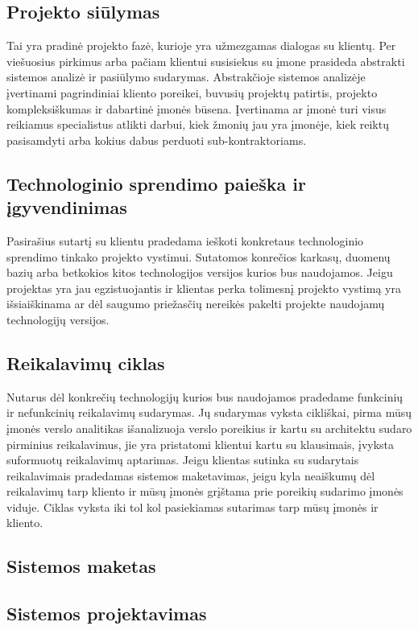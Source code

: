 \documentclass{VUMIFPSkursinis}
\begin{document}
	\subsection{Projekto siūlymas}
		Tai yra pradinė projekto fazė, kurioje yra užmezgamas dialogas su klientų. Per viešuosius pirkimus arba pačiam klientui susisiekus su įmone prasideda abstrakti sistemos analizė ir pasiūlymo sudarymas. Abstrakčioje sistemos analizėje įvertinami pagrindiniai kliento poreikei, buvusių projektų patirtis, projekto kompleksiškumas ir dabartinė įmonės būsena. Įvertinama ar įmonė turi visus reikiamus specialistus atlikti darbui, kiek žmonių jau yra įmonėje, kiek reiktų pasisamdyti arba kokius dabus perduoti sub-kontraktoriams.

	\subsection{Technologinio sprendimo paieška ir įgyvendinimas}
		Pasirašius sutartį su klientu pradedama ieškoti konkretaus technologinio sprendimo tinkako projekto vystimui. Sutatomos konrečios karkasų, duomenų bazių arba betkokios kitos technologijos versijos kurios bus naudojamos. Jeigu projektas yra jau egzistuojantis ir klientas perka tolimesnį projekto vystimą yra išsiaiškinama ar dėl saugumo priežasčių nereikės pakelti projekte naudojamų technologijų versijos.
	\subsection{Reikalavimų ciklas}
		Nutarus dėl konkrečių technologijų kurios bus naudojamos pradedame funkcinių ir nefunkcinių reikalavimų sudarymas. Jų sudarymas vyksta cikliškai, pirma mūsų įmonės verslo analitikas išanalizuoja verslo poreikius ir kartu su architektu sudaro pirminius reikalavimus, jie yra pristatomi klientui kartu su klausimais, įvyksta suformuotų reikalavimų aptarimas. Jeigu klientas sutinka su sudarytais reikalavimais pradedamas sistemos maketavimas, jeigu kyla neaiškumų dėl reikalavimų tarp kliento ir mūsų įmonės grįštama prie poreikių sudarimo įmonės viduje. Ciklas vyksta iki tol kol pasiekiamas sutarimas tarp mūsų įmonės ir kliento.
	\subsection{Sistemos maketas}
	\subsection{Sistemos projektavimas}
\end{document}
